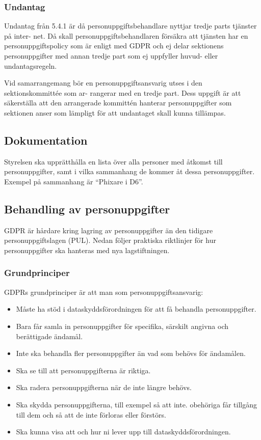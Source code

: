\documentclass[a4paper]{dtek}
\begin{document}
\subsubsection{Undantag}
Undantag från 5.4.1 är då personuppgiftsbehandlare nyttjar tredje parts tjänster på inter-
net. Då skall personuppgiftsbehandlaren försäkra att tjänsten har en personuppgiftspolicy som är enligt med GDPR och ej delar sektionens personuppgifter med annan tredje part
som ej uppfyller huvud- eller undantagsregeln.

Vid samarrangemang bör en personuppgiftsansvarig utses i den sektionskommittée som ar-
rangerar med en tredje part. Dess uppgift är att säkerställa att den arrangerade kommittén
hanterar personuppgifter som sektionen anser som lämpligt för att undantaget skall kunna
tillämpas.

\subsection{Dokumentation}
Styrelsen ska upprätthålla en lista över alla personer med åtkomst till personuppgifter,
samt i vilka sammanhang de kommer åt dessa personuppgifter. Exempel på sammanhang
är \enquote{Phixare i D6}.

\subsection{Behandling av personuppgifter}
GDPR är hårdare kring lagring av personuppgifter än den tidigare personuppgiftslagen
(PUL). Nedan följer praktiska riktlinjer för hur personuppgifter ska hanteras med nya
lagstiftningen.

\subsubsection{Grundprinciper}
GDPRs grundprinciper är att man som personuppgiftsansvarig:
\begin{itemize}
    \item Måste ha stöd i dataskyddsförordningen för att få behandla personuppgifter.
    \item Bara får samla in personuppgifter för specifika, särskilt angivna och berättigade ändamål.
    \item Inte ska behandla fler personuppgifter än vad som behövs för ändamålen.
    \item Ska se till att personuppgifterna är riktiga.
    \item Ska radera personuppgifterna när de inte längre behövs.
    \item Ska skydda personuppgifterna, till exempel så att inte. obehöriga får tillgång till dem och så att de inte förloras eller förstörs.
    \item Ska kunna visa att och hur ni lever upp till dataskyddsförordningen.
\end{itemize}
\end{document}
